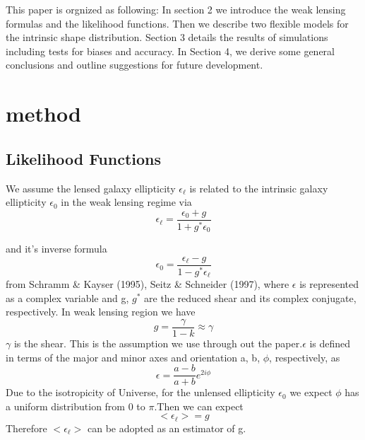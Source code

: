 \documentclass[useAMS,usenatbib]{mn2e}
\begin{document}
This paper is orgnized as following: In section 2 we introduce the
weak lensing formulas and the likelihood functions. Then we describe
two flexible models for the intrinsic shape distribution. Section 3 details
the results of simulations including tests for biases and accuracy. In Section 4, we
derive some general conclusions and outline suggestions for future
development.




\section{method}

\label{sec:XXX}


\subsection{Likelihood Functions}

We assume the lensed galaxy ellipticity $\epsilon_{\ell}$ is related
to the intrinsic galaxy ellipticity $\epsilon_{0}$ in the weak lensing
regime via 
\begin{equation}
\epsilon_{\ell}=\frac{\epsilon_{0}+g}{1+g^{*}\epsilon_{0}}
\end{equation}


and it's inverse formula 
\begin{equation}
\epsilon_{0}=\frac{\epsilon_{\ell}-g}{1-g^{*}\epsilon_{\ell}}
\end{equation}
from Schramm \& Kayser (1995), Seitz \& Schneider (1997), where $\epsilon$
is represented as a complex variable and g, $g^{*}$ are the reduced
shear and its complex conjugate, respectively. In weak lensing region we have 
\begin{equation}
g=\frac{\gamma}{1-k}\approx\gamma
\end{equation}
$\gamma$ is the shear. This is the assumption we use through out
the paper.$\epsilon$ is defined in terms of the major and minor axes and orientation a, b, $\phi$,
respectively, as
\begin{equation}
\epsilon=\frac{a-b}{a+b}e^{2i\phi}
\end{equation}
Due to the isotropicity of Universe, for the unlensed ellipticity $\epsilon_{0}$ 
we expect $\phi$ has a uniform distribution
from 0 to $\pi$.Then we can expect 
\begin{equation}
<\epsilon_{\ell}>=g
\end{equation}
Therefore $<\epsilon_{\ell}>$ can be adopted as an estimator of g.
\end{document}
